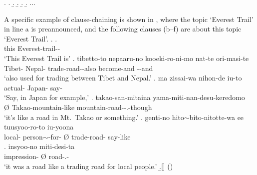 %
\ex.
 \a. 
 \b. 
 \b. 
 \b. 
 \b. ...

A specific example of clause-chaining is shown in \Next,
where the topic `Everest Trail' in line a is preannounced,
and the following clauses (b--f) are about this topic `Everest Trail'.
%
\ex.
\ag.   \\
	this Everest-trail-- \\
	`{This Everest Trail} is'
\bg. tibetto-to nepaaru-no kooeki-ro-ni-mo nat-te ori-masi-te \\
	Tibet- Nepal- trade-road--also become-and --and \\
	`also used for trading  between Tibet and Nepal.'
\cg. ma zissai-wa nihon-de iu-to \tp{\dvline} \\
	 actual- Japan- say- \\
	`Say, in Japan for example,'
\dg. \EM{\O} takao-san-mitaina yama-miti-nan-desu-keredomo \\
	{\O} Takao-mountain-like mountain-road--.-though \\
	`it's like a road in Mt.\ Takao or something.'
\eg. genti-no hito$\sim$bito-nitotte-wa ee \EM{\O} tuusyoo-ro-to iu-yoona \\
	local- person$\sim$-for-  {\O} trade-road- say-like \\
\bg. insyoo-no \EM{\O} miti-desi-ta \\
	 impression- {\O} road-.- \\
 `{it} was a road like a trading road for local people.'
 \b.[] \hfill{()}


